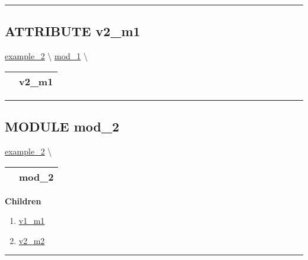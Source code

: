 \rule{\linewidth}{0.5pt}
\subsection*{\textsf{\colorbox{headtoc}{\color{white} ATTRIBUTE}
v2\_m1}}

\hypertarget{ecldoc:intest.inintest.example_2.mod_1.v2_m1}{}
\hspace{0pt} \hyperlink{ecldoc:intest.inintest.example_2}{example_2} \textbackslash 
\hspace{0pt} \hyperlink{ecldoc:intest.inintest.example_2.mod_1}{mod_1} \textbackslash 

{\renewcommand{\arraystretch}{1.5}
\begin{tabularx}{\textwidth}{|>{\raggedright\arraybackslash}l|X|}
\hline
\hspace{0pt}\mytexttt{\color{red} } & \textbf{v2\_m1} \\
\hline
\end{tabularx}
}

\par


\rule{\linewidth}{0.5pt}


\subsection*{\textsf{\colorbox{headtoc}{\color{white} MODULE}
mod\_2}}

\hypertarget{ecldoc:intest.inintest.example_2.mod_2}{}
\hspace{0pt} \hyperlink{ecldoc:intest.inintest.example_2}{example_2} \textbackslash 

{\renewcommand{\arraystretch}{1.5}
\begin{tabularx}{\textwidth}{|>{\raggedright\arraybackslash}l|X|}
\hline
\hspace{0pt}\mytexttt{\color{red} } & \textbf{mod\_2} \\
\hline
\end{tabularx}
}

\par


\textbf{Children}
\begin{enumerate}
\item \hyperlink{ecldoc:intest.inintest.example_2.mod_2.v1_m1}{v1\_m1}
\item \hyperlink{ecldoc:intest.inintest.example_2.mod_2.v2_m2}{v2\_m2}
\end{enumerate}

\rule{\linewidth}{0.5pt}

